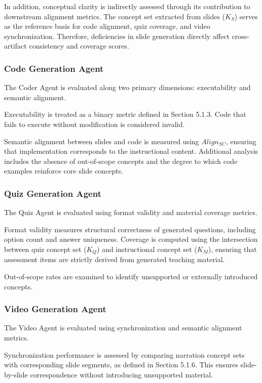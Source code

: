 \documentclass[10pt,journal,compsoc]{IEEEtran}
\begin{document}
In addition, conceptual clarity is indirectly assessed through its contribution to downstream alignment metrics. The concept set extracted from slides ($K_S$) serves as the reference basis for code alignment, quiz coverage, and video synchronization. Therefore, deficiencies in slide generation directly affect cross-artifact consistency and coverage scores.

\subsubsection{Code Generation Agent}

The Coder Agent is evaluated along two primary dimensions: executability and semantic alignment.

Executability is treated as a binary metric defined in Section 5.1.3. Code that fails to execute without modification is considered invalid.

Semantic alignment between slides and code is measured using $Align_{SC}$, ensuring that implementation corresponds to the instructional content. Additional analysis includes the absence of out-of-scope concepts and the degree to which code examples reinforce core slide concepts.

\subsubsection{Quiz Generation Agent}

The Quiz Agent is evaluated using format validity and material coverage metrics.

Format validity measures structural correctness of generated questions, including option count and answer uniqueness. Coverage is computed using the intersection between quiz concept set ($K_Q$) and instructional concept set ($K_M$), ensuring that assessment items are strictly derived from generated teaching material.

Out-of-scope rates are examined to identify unsupported or externally introduced concepts.

\subsubsection{Video Generation Agent}

The Video Agent is evaluated using synchronization and semantic alignment metrics.

Synchronization performance is assessed by comparing narration concept sets with corresponding slide segments, as defined in Section 5.1.6. This ensures slide-by-slide correspondence without introducing unsupported material.
\end{document}
